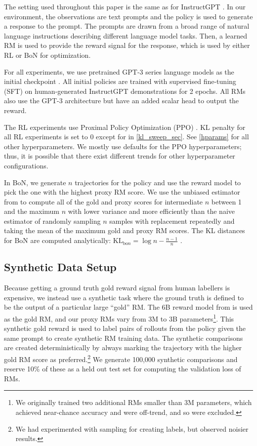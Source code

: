 \documentclass{article}
\theoremstyle{plain}
\begin{document}
The setting used throughout this paper is the same as for InstructGPT \citep{instructgpt}. In our environment, the observations are text prompts and the policy is used to generate a response to the prompt. The prompts are drawn from a broad range of natural language instructions describing different language model tasks. Then, a learned RM is used to provide the reward signal for the response, which is used by either RL or BoN for optimization.

For all experiments, we use pretrained GPT-3 series language models as the initial checkpoint \citep{GPT3}. All initial policies are trained with supervised fine-tuning (SFT) on human-generated InstructGPT demonstrations \citep{instructgpt} for 2 epochs. All RMs also use the GPT-3 architecture but have an added scalar head to output the reward. 

The RL experiments use Proximal Policy Optimization (PPO) \citep{schulman2017proximal}. KL penalty for all RL experiments is set to 0 except for in \cref{kl_sweep_sec}. See \cref{hparams} for all other hyperparameters. We mostly use defaults for the PPO hyperparameters; thus, it is possible that there exist different trends for other hyperparameter configurations.

In BoN, we generate $n$ trajectories for the policy and use the reward model to pick the one with the highest proxy RM score. We use the unbiased estimator from \citet[Appendix I]{webgpt} to compute all of the gold and proxy scores for intermediate $n$ between 1 and the maximum $n$ with lower variance and more efficiently than the naive estimator of randomly sampling $n$ samples with replacement repeatedly and taking the mean of the maximum gold and proxy RM scores. The KL distances for BoN are computed analytically: $\text{KL}_{\text{bo}n} = \log n - \frac{n-1}{n}$ \citep[Appendix G.3]{summarization}. 

\subsection{Synthetic Data Setup}

Because getting a ground truth gold reward signal from human labellers is expensive, we instead use a synthetic task where the ground truth is defined to be the output of a particular large ``gold'' RM. The 6B reward model from \citet{instructgpt} is used as the gold RM, and our proxy RMs vary from 3M to 3B parameters\footnote{We originally trained two additional RMs smaller than 3M parameters, which achieved near-chance accuracy and were off-trend, and so were excluded.}. This synthetic gold reward is used to label pairs of rollouts from the policy given the same prompt to create synthetic RM training data. The synthetic comparisons are created deterministically by always marking the trajectory with the higher gold RM score as preferred.\footnote{We had experimented with sampling for creating labels, but observed noisier results.} We generate 100,000 synthetic comparisons and reserve 10\% of these as a held out test set for computing the validation loss of RMs.
\end{document}
